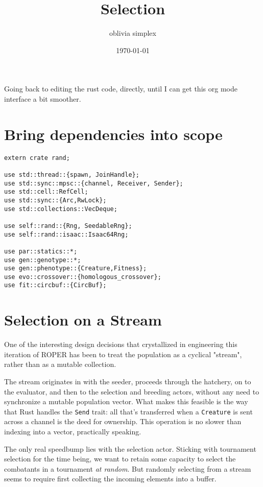 \documentclass[11pt]{article}
\author{oblivia simplex}
\date{\today}
\title{Selection}
\begin{document}
\maketitle
\tableofcontents

Going back to editing the rust code, directly, until I can get
this org mode interface a bit smoother.

\section{Bring dependencies into scope}
\label{sec:org66c170a}
\lstset{language=rust,label=orgbcea56f,caption= ,captionpos=b,numbers=none}
\begin{lstlisting}
extern crate rand; 

use std::thread::{spawn, JoinHandle};
use std::sync::mpsc::{channel, Receiver, Sender};
use std::cell::RefCell;
use std::sync::{Arc,RwLock}; 
use std::collections::VecDeque;

use self::rand::{Rng, SeedableRng};
use self::rand::isaac::Isaac64Rng;

use par::statics::*;
use gen::genotype::*;
use gen::phenotype::{Creature,Fitness};
use evo::crossover::{homologous_crossover};
use fit::circbuf::{CircBuf};
\end{lstlisting}

\section{Selection on a Stream}
\label{sec:org1b91baa}

One of the interesting design decisions that crystallized in engineering
this iteration of ROPER has been to treat the population as a cyclical
"stream", rather than as a mutable collection. 

The stream originates in with the seeder, proceeds through the hatchery,
on to the evaluator, and then to the selection and breeding actors, without
any need to synchronize a mutable population vector. What makes this feasible
is the way that Rust handles the \texttt{Send} trait: all that's transferred when a
\texttt{Creature} is sent across a channel is the deed for ownership. This operation
is no slower than indexing into a vector, practically speaking. 

The only real speedbump lies with the selection actor. Sticking with tournament
selection for the time being, we want to retain some capacity to select the
combatants in a tournament \emph{at random}. But randomly selecting from a stream
seems to require first collecting the incoming elements into a buffer. 
\end{document}
